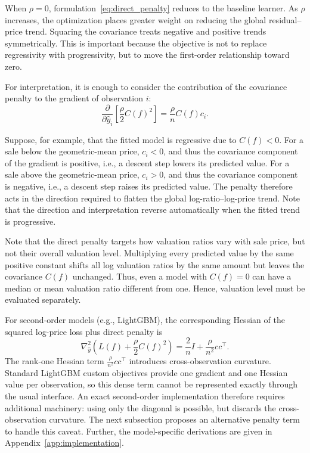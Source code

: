 \documentclass[10pt]{article}
\theoremstyle{definition}
\newcommand{\1}{\mathbf{1}}
\begin{document}
When $\rho=0$, formulation~\eqref{eq:direct_penalty} reduces to the baseline learner. As $\rho$ increases, the optimization places greater weight on reducing the global residual--price trend. Squaring the covariance treats negative and positive trends symmetrically. This is important because the objective is not to replace regressivity with progressivity, but to move the first-order relationship toward zero.


{For interpretation, it is enough to consider the contribution of the covariance penalty to the gradient of observation $i$:}
{
\begin{equation}
\label{eq:direct_penalty_gradient}
\frac{\partial}{\partial \widehat y_i}
\left[
\frac{\rho}{2}C(f)^2
\right]
=
\frac{\rho}{n}C(f)c_i.
\end{equation}
}


{Suppose, for example, that the fitted model is regressive due to $C(f)<0$. For a sale below the geometric-mean price, $c_i<0$, and thus the covariance component of the gradient is positive, i.e., a descent step lowers its predicted value. For a sale above the geometric-mean price, $c_i>0$, and thus the covariance component is negative, i.e., a descent step raises its predicted value. The penalty therefore acts in the direction required to flatten the global log-ratio--log-price trend. Note that the direction and interpretation reverse automatically when the fitted trend is progressive.}


Note that the direct penalty targets how valuation ratios vary with sale price, but not their
overall valuation level. Multiplying every predicted value by the same positive constant shifts all log valuation ratios by the same amount but leaves the covariance $C(f)$ unchanged. Thus, even a model with $C(f)=0$ can have a median or mean valuation ratio different from one. Hence, valuation level must be evaluated separately.


{For second-order models (e.g., LightGBM), the corresponding Hessian of the squared log-price loss plus direct penalty is}
{
\begin{equation}
\label{eq:direct_gradient_hessian}
\nabla_{\widehat y}^2
\left(
L(f)+\frac{\rho}{2}C(f)^2
\right)
=
\frac{2}{n}I+\frac{\rho}{n^2}cc^\top.
\end{equation}
}
The rank-one Hessian term $\frac{\rho}{n^{2}}cc^\top$ introduces cross-observation curvature. Standard LightGBM custom objectives provide one gradient and one Hessian value per observation, so this dense term cannot be represented exactly through the usual interface. An exact second-order implementation therefore requires additional machinery: using only the diagonal is possible, but discards the cross-observation curvature. The next subsection proposes an alternative penalty term to handle this caveat. Further, the model-specific derivations are given in Appendix~\ref{app:implementation}.
\end{document}
